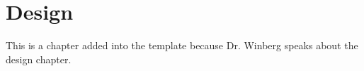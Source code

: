 \chapter{Design}

This is a chapter added into the template because Dr. Winberg speaks about the design chapter.
